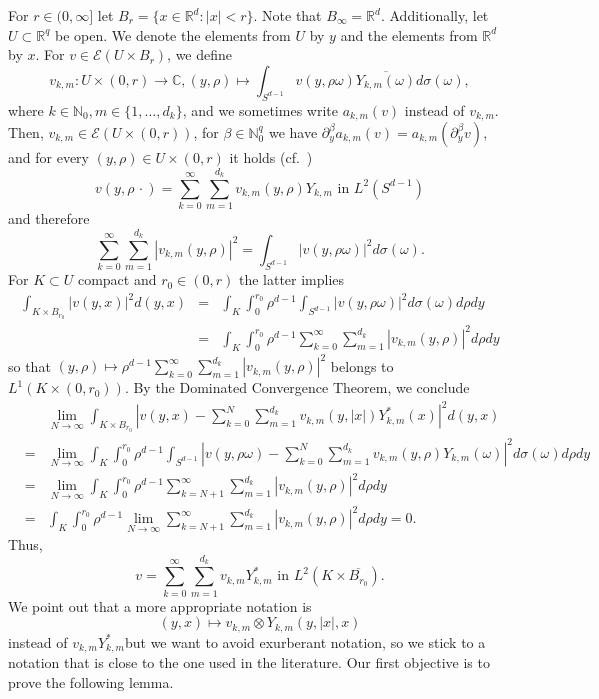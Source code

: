 \documentclass[a4paper,10pt]{amsart}
\newtheorem*{crucial lemma}{Lemma \ref{lem:nice polynomial2}}
\theoremstyle{definition}
\newcommand{\R}{\mathbb{R}}
\newcommand{\C}{\mathbb{C}}
\newcommand{\N}{\mathbb{N}}
\begin{document}
For $r\in(0,\infty]$ let $B_r=\{x\in\R^d\colon |x|<r\}$. Note that $B_\infty=\R^d$. Additionally, let $U\subset\R^q$ be open. We denote the elements from $U$ by $y$ and the elements from $\R^d$ by $x$. For $v\in \mathscr{E}(U\times B_r)$, we define
\begin{equation}\label{eq:definition coefficients of v}
	v_{k,m}:U\times(0,r)\rightarrow\C,(y,\rho)\mapsto\int_{S^{d-1}}v(y,\rho\omega)\overline{Y_{k,m}(\omega)}d\sigma(\omega),
\end{equation}
where $k\in\N_0, m\in\{1,\ldots,d_k\}$, and we sometimes write $a_{k,m}(v)$ instead of $v_{k,m}$. Then, $v_{k,m}\in\mathscr{E}(U\times(0,r))$, for $\beta\in\N_0^q$ we have $\partial_y^\beta a_{k,m}(v)=a_{k,m}(\partial_y^\beta v)$, and for every $(y,\rho)\in U\times (0,r)$ it holds (cf.~\cite[Theorem (2.53)]{Folland1995})
\[v(y,\rho\, \cdot)=\sum_{k=0}^\infty\sum_{m=1}^{d_k} v_{k,m}(y,\rho)Y_{k,m}\text{ in }L^2(S^{d-1})\]
and therefore
\[\sum_{k=0}^\infty\sum_{m=1}^{d_k} |v_{k,m}(y,\rho)|^2=\int_{S^{d-1}} |v(y,\rho\omega)|^2 d\sigma(\omega).\]
For $K\subset U$ compact and $r_0\in (0,r)$ the latter implies
\begin{eqnarray*}
	\int_{K\times B_{r_0}} |v(y,x)|^2 d(y,x)&=&\int_K\int_0^{r_0}\rho^{d-1} \int_{S^{d-1}} |v(y,\rho\omega)|^2 d\sigma(\omega) d\rho dy\\
	&=&\int_K\int_0^{r_0}\rho^{d-1} \sum_{k=0}^\infty\sum_{m=1}^{d_k} |v_{k,m}(y,\rho)|^2 d\rho dy
\end{eqnarray*}
so that $(y,\rho)\mapsto \rho^{d-1} \sum_{k=0}^\infty\sum_{m=1}^{d_k} |v_{k,m}(y,\rho)|^2$ belongs to  $L^1(K\times (0,r_0))$. By the Dominated Convergence Theorem, we conclude
\begin{eqnarray*}
	&&\lim_{N\rightarrow\infty}\int_{K\times B_{r_0}}\left| v(y,x)-\sum_{k=0}^N\sum_{m=1}^{d_k} v_{k,m}(y,|x|) Y_{k,m}^*(x)\right|^2 d(y,x)\\
	&=&\lim_{N\rightarrow\infty}\int_{K}\int_0^{r_0}\rho^{d-1} \int_{S^{d-1}}\left| v(y,\rho\omega)-\sum_{k=0}^N\sum_{m=1}^{d_k} v_{k,m}(y,\rho) Y_{k,m}(\omega)\right|^2d\sigma(\omega)d\rho dy\\
	&=&\lim_{N\rightarrow\infty}\int_{K}\int_0^{r_0}\rho^{d-1}  \sum_{k=N+1}^\infty\sum_{m=1}^{d_k} |v_{k,m}(y,\rho)|^2  d\rho dy\\
	&=&\int_{K}\int_0^{r_0}\rho^{d-1}  \lim_{N\rightarrow\infty}\sum_{k=N+1}^\infty\sum_{m=1}^{d_k} |v_{k,m}(y,\rho)|^2  d\rho dy=0.
\end{eqnarray*}
Thus,
\begin{equation}\label{eq:convergence in local L2}
	v=\sum_{k=0}^\infty \sum_{m=1}^{d_k} v_{k,m} Y^*_{k,m}\text{ in }L^2(K\times \overline{B_{r_0}}).
\end{equation}
We point out that a more appropriate notation is
\[(y,x)\mapsto v_{k,m}\otimes Y_{k,m}(y,|x|,x)\]
instead of $v_{k,m}Y_{k,m}^*$but we want to avoid exurberant notation, so we stick to a notation that is close to the one used in the literature. Our first objective is to prove the following lemma.
\end{document}
